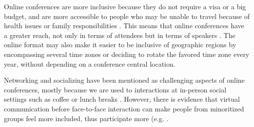 \documentclass[10pt,letterpaper]{article}
\begin{document}
Online conferences are more inclusive because they do not require a visa or a big budget, and are more accessible to people who may be unable to travel because of health issues or family responsibilities \cite{salibaGettingGripsOnline2020}.
This means that online conferences have a greater reach, not only in terms of attendees but in terms of speakers  \cite{atkinsonJournalMedicine20202021, roosOnlineConferencesNew2020, jooKeepOnlineOption2021}.
The online format may also make it easier to be inclusive of geographic regions by encompassing several time zones or deciding to rotate the favored time zone every year, without depending on a conference central location. 

Networking and socializing have been mentioned as challenging aspects of online conferences, mostly because we are used to interactions at in-person social settings such as coffee or lunch breaks \cite{salibaGettingGripsOnline2020, roosOnlineConferencesNew2020}. 
However, there is evidence that virtual communication before face-to-face interaction can make people from minoritized groups feel more included, thus participate more (e.g. \cite{trianaDoesOrderFacetoFace2012,blackEngenderingBelongingThoughtful2020}.
\end{document}
